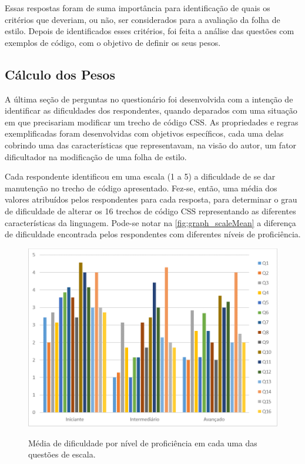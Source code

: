 

Essas respostas foram de suma importância para identificação de quais os critérios que deveriam, ou não, ser considerados para a avaliação da folha de estilo. Depois de identificados esses critérios, foi feita a análise das questões com exemplos de código, com o objetivo de definir os seus pesos.

\subsection{Cálculo dos Pesos}

A última seção de perguntas no questionário foi desenvolvida com a intenção de identificar as dificuldades dos respondentes, quando deparados com uma situação em que precisariam modificar um trecho de código CSS. As propriedades e regras exemplificadas foram desenvolvidas com objetivos específicos, cada uma delas cobrindo uma das características que representavam, na visão do autor, um fator dificultador na modificação de uma folha de estilo.

Cada respondente identificou em uma escala (1 a 5) a dificuldade de se dar manutenção no trecho de código apresentado. Fez-se, então, uma média dos valores atribuídos pelos respondentes para cada resposta, para determinar o grau de dificuldade de alterar os 16 trechos de código CSS representando as diferentes características da linguagem. Pode-se notar na \autoref{fig:graph_scaleMean} a diferença de dificuldade encontrada pelos respondentes com diferentes níveis de proficiência.

\begin{figure}[!htb]
	\centering
	\caption{Média de dificuldade por nível de proficiência em cada uma das questões de escala.}
	\includegraphics[width=1\textwidth]{./04-figuras/graph_scaleMean}
	\label{fig:graph_scaleMean}
\end{figure}

